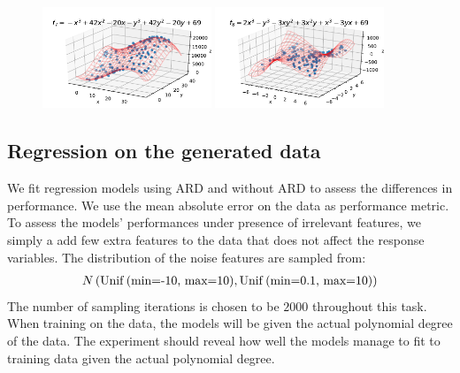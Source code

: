 \documentclass[12pt]{article}
\begin{document}
\begin{figure}[H]
            \includegraphics[width=0.45\textwidth, height=0.22\textheight]{f_7_3d.pdf}
            \includegraphics[width=0.45\textwidth, height=0.22\textheight]{f_8_3d.pdf}
            \caption{} \label{fig:simfuncs}
        \end{figure}
    
    \subsection{Regression on the generated data}
        We fit regression models using ARD and without ARD to assess the differences in performance. We use the mean absolute error on the data as performance metric. To assess the models' performances under presence of irrelevant features, we simply a add few extra features to the data that does not affect the response variables. The distribution of the noise features are sampled from:
        \begin{align*}
            N\left(\operatorname{Unif}\text{(min=-10, max=10)}, \operatorname{Unif}\text{(min=0.1, max=10)}\right)
        \end{align*}
        The number of sampling iterations is chosen to be $2000$ throughout this task. When training on the data, the models will be given the actual polynomial degree of the data. The experiment should reveal how well the models manage to fit to training data given the actual polynomial degree. 
\end{document}

